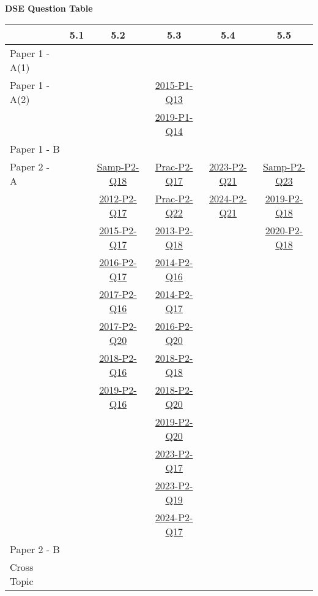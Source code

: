 \documentclass[12pt, a4paper]{article}
\begin{document}
\begin{absolutelynopagebreak}
\begin{center}
\textbf{DSE Question Table}
\end{center}
\begin{center}
\begin{tabular}{|l|c|c|c|c|c|}
\hline
        & 5.1 & 5.2 & 5.3 & 5.4 & 5.5 \\\hline
\hline
Paper 1 - A(1)&  &  &  &  &  \\
\hline
Paper 1 - A(2)&  &  & \hyperref[DSE2015-CoreP1-Q13]{2015-P1-Q13} &  &  \\
&  &  & \hyperref[DSE2019-CoreP1-Q14]{2019-P1-Q14} &  &  \\
\hline
Paper 1 - B&  &  &  &  &  \\
\hline
\hline
Paper 2 - A&  & \hyperref[DSE2012S-CoreP2-Q18]{Samp-P2-Q18} & \hyperref[DSE2012P-CoreP2-Q17]{Prac-P2-Q17} & \hyperref[DSE2023-CoreP2-Q21]{2023-P2-Q21} & \hyperref[DSE2012S-CoreP2-Q23]{Samp-P2-Q23} \\
&  & \hyperref[DSE2012-CoreP2-Q17]{2012-P2-Q17} & \hyperref[DSE2012P-CoreP2-Q22]{Prac-P2-Q22} & \hyperref[DSE2024-CoreP2-Q21]{2024-P2-Q21} & \hyperref[DSE2019-CoreP2-Q18]{2019-P2-Q18} \\
&  & \hyperref[DSE2015-CoreP2-Q17]{2015-P2-Q17} & \hyperref[DSE2013-CoreP2-Q18]{2013-P2-Q18} &  & \hyperref[DSE2020-CoreP2-Q18]{2020-P2-Q18} \\
&  & \hyperref[DSE2016-CoreP2-Q17]{2016-P2-Q17} & \hyperref[DSE2014-CoreP2-Q16]{2014-P2-Q16} &  &  \\
&  & \hyperref[DSE2017-CoreP2-Q16]{2017-P2-Q16} & \hyperref[DSE2014-CoreP2-Q17]{2014-P2-Q17} &  &  \\
&  & \hyperref[DSE2017-CoreP2-Q20]{2017-P2-Q20} & \hyperref[DSE2016-CoreP2-Q20]{2016-P2-Q20} &  &  \\
&  & \hyperref[DSE2018-CoreP2-Q16]{2018-P2-Q16} & \hyperref[DSE2018-CoreP2-Q18]{2018-P2-Q18} &  &  \\
&  & \hyperref[DSE2019-CoreP2-Q16]{2019-P2-Q16} & \hyperref[DSE2018-CoreP2-Q20]{2018-P2-Q20} &  &  \\
&  &  & \hyperref[DSE2019-CoreP2-Q20]{2019-P2-Q20} &  &  \\
&  &  & \hyperref[DSE2023-CoreP2-Q17]{2023-P2-Q17} &  &  \\
&  &  & \hyperref[DSE2023-CoreP2-Q19]{2023-P2-Q19} &  &  \\
&  &  & \hyperref[DSE2024-CoreP2-Q17]{2024-P2-Q17} &  &  \\
\hline
Paper 2 - B&  &  &  &  &  \\
\hline
\hline
Cross Topic&  &  &  &  &  \\
\hline
\end{tabular}
\end{center}
\end{absolutelynopagebreak}
\end{document}
